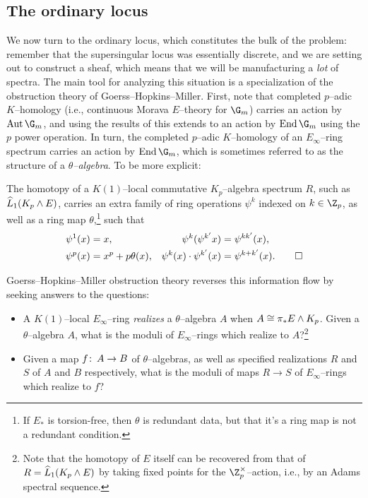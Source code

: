 \subsection*{The ordinary locus}

We now turn to the ordinary locus, which constitutes the bulk of the problem: remember that the supersingular locus was essentially discrete, and we are setting out to construct a sheaf, which means that we will be manufacturing a \emph{lot} of spectra.  The main tool for analyzing this situation is a specialization of the obstruction theory of Goerss--Hopkins--Miller.  First, note that completed \(p\)--adic \(K\)--homology (i.e., continuous Morava \(E\)--theory for \(\G_m\)) carries an action by \(\Aut \G_m\), and using the results of  this extends to an action by \(\End \G_m\) using the \(p\){\th} power operation.  In turn, the completed \(p\)--adic \(K\)--homology of an \(E_\infty\)--ring spectrum carries an action by \(\End \G_m\), which is sometimes referred to as the structure of a \textit{\(\theta\)--algebra}.  To be more explicit:
\begin{theorem}
The homotopy of a \(K(1)\)--local commutative \(K_p\)--algebra spectrum \(R\), such as \(\widehat L_1 (K_p \wedge E)\), carries an extra family of ring operations \(\psi^k\) indexed on \(k \in \Z_p\), as well as a ring map \(\theta\),\footnote{If \(E_*\) is torsion-free, then \(\theta\) is redundant data, but that it's a ring map is not a redundant condition.} such that
\pushQED{\qed}
\begin{align*}
\psi^1(x) & = x, &
\psi^k (\psi^{k'} x) & = \psi^{kk'}(x), \\
\psi^p(x) & = x^p + p\theta(x), &
\psi^k(x) \cdot \psi^{k'}(x) & = \psi^{k + k'}(x). \qedhere
\end{align*}
\popQED
\end{theorem}
\noindent Goerss--Hopkins--Miller obstruction theory reverses this information flow by seeking answers to the questions:
\begin{itemize}
    \item A \(K(1)\)--local \(E_\infty\)--ring \textit{realizes} a \(\theta\)--algebra \(A\) when \(A \cong \pi_* E \wedge K_p\).  Given a \(\theta\)--algebra \(A\), what is the moduli of \(E_\infty\)--rings which realize to \(A\)?\footnote{Note that the homotopy of \(E\) itself can be recovered from that of \(R = \widehat L_1 (K_p \wedge E)\) by taking fixed points for the \(\Z_p^\times\)--action, i.e., by an Adams spectral sequence.}
    \item Given a map \(f\colon\thinspace A \to B\) of \(\theta\)--algebras, as well as specified realizations \(R\) and \(S\) of \(A\) and \(B\) respectively, what is the moduli of maps \(R \to S\) of \(E_\infty\)--rings which realize to \(f\)?
\end{itemize}

